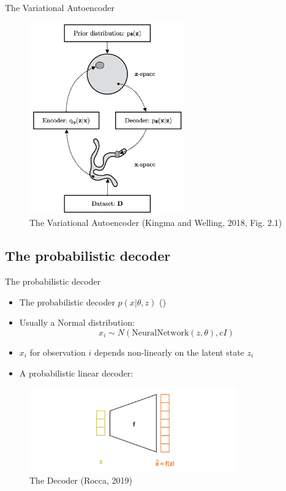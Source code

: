 \documentclass[10pt]{beamer}
\begin{document}
\begin{frame}{The Variational Autoencoder}

\begin{figure}[h]
\centering
\includegraphics[width=0.6\textwidth]{fig/Kingma_Welling_2018_Fig_2_1.png}
\caption{The Variational Autoencoder (Kingma and Welling, 2018, Fig. 2.1)}
\end{figure}

\end{frame}


\subsection{The probabilistic decoder}

\begin{frame}{The probabilistic decoder}
\begin{itemize}
\item The probabilistic decoder $p(x|\theta, z)$ ()
\item Usually a Normal distribution:
\[
x_i \sim N(\text{NeuralNetwork}(z,\theta), c I)
\]
\item $x_i$ for observation $i$ depends non-linearly on the latent state $z_i$
\pause
\item A probabilistic linear decoder: 
\end{itemize}

\begin{figure}[h]
\centering
\includegraphics[width=0.8\textwidth]{fig/Rocca_VAE_decoder.png}
\caption{The Decoder (Rocca, 2019)}
\end{figure}

\end{frame}
\end{document}
